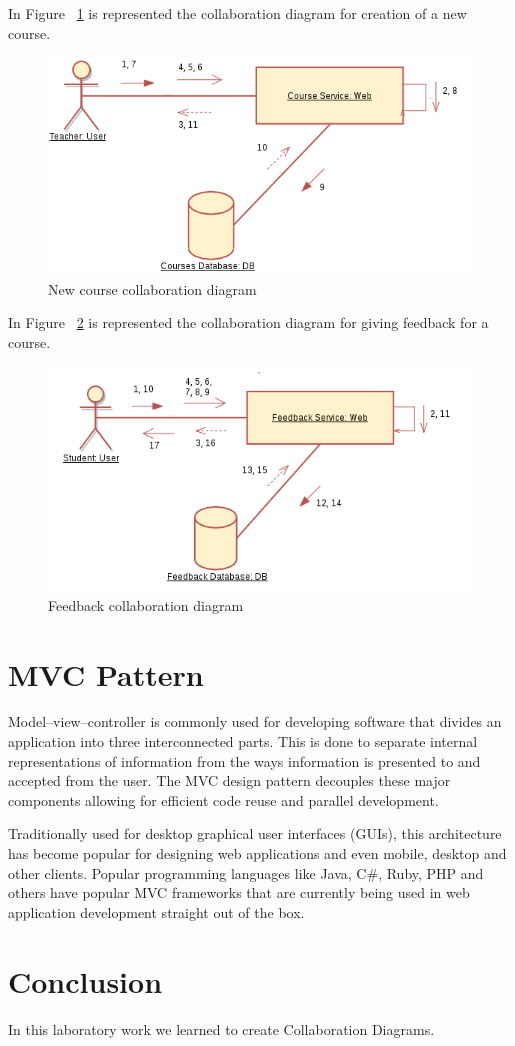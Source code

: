 \documentclass[12pt,a4paper,titlepage]{article}
\begin{document}
In Figure ~\ref{fig:create} is represented the collaboration diagram for creation of a new course.
\begin{figure}[H]
	\includegraphics[width=\textwidth]{create}
	\caption{New course collaboration diagram}
	\centering
	\label{fig:create}
\end{figure}

In Figure ~\ref{fig:feedback} is represented the collaboration diagram for giving feedback for a course.
\begin{figure}[H]
\includegraphics[width=\textwidth]{feedback}
\caption{Feedback collaboration diagram}
\centering
\label{fig:feedback}
\end{figure}


\section{MVC Pattern}
Model–view–controller is commonly used for developing software that divides an application into three interconnected parts. This is done to separate internal representations of information from the ways information is presented to and accepted from the user. The MVC design pattern decouples these major components allowing for efficient code reuse and parallel development.\par
Traditionally used for desktop graphical user interfaces (GUIs), this architecture has become popular for designing web applications and even mobile, desktop and other clients. Popular programming languages like Java, C\#, Ruby, PHP and others have popular MVC frameworks that are currently being used in web application development straight out of the box.\par
\section{Conclusion}
In this laboratory work we learned to create Collaboration Diagrams.

\clearpage
\cleardoublepage
\end{document}
